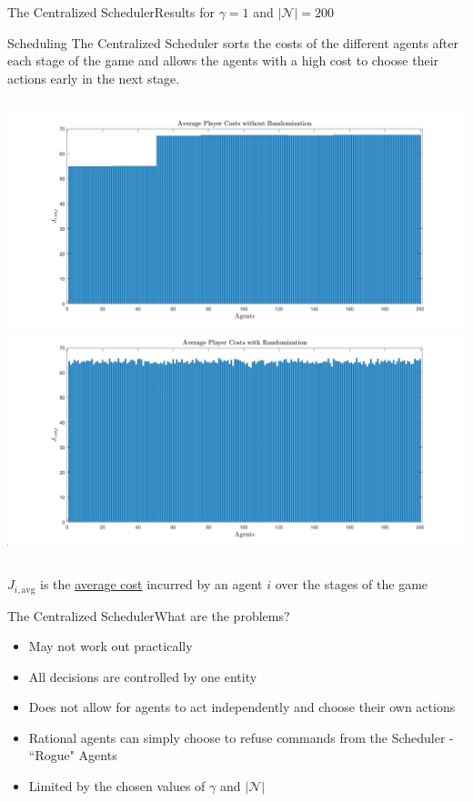 \documentclass[aspectratio=169]{beamer}
\begin{document}
\begin{frame}{The Centralized Scheduler}{Results for $\gamma = 1$ and $|\mathcal{N}|=200$}
\begin{block}{Scheduling}
    The Centralized Scheduler sorts the costs of the different agents after each stage of the game and allows the agents with a high cost to choose their actions early in the next stage. 
\end{block}
\begin{columns}
            \includegraphics[width=\linewidth, trim={150 0 150 0}, clip]{images/results_central_scheduler_avg_player_no_random.jpg}
            \includegraphics[width=\linewidth, trim={150 0 150 0}, clip]{images/results_central_scheduler_avg_player_random.jpg}
\end{columns}
\begin{block}{}
            $J_{i, \text{avg}}$ is the \underline{average cost} incurred by an agent $i$ over the stages of the game
        \end{block}
\end{frame}

\begin{frame}{The Centralized Scheduler}{What are the problems?}
\begin{itemize}
    \item<1-> May not work out practically
    \item<2-> All decisions are controlled by one entity 
    \item<3-> Does not allow for agents to act independently and choose their own actions
    \item<4-> Rational agents can simply choose to refuse commands from the Scheduler - ``Rogue" Agents
    \item<5-> Limited by the chosen values of $\gamma$ and $|\mathcal{N}|$
\end{itemize}
\end{frame}
\end{document}
